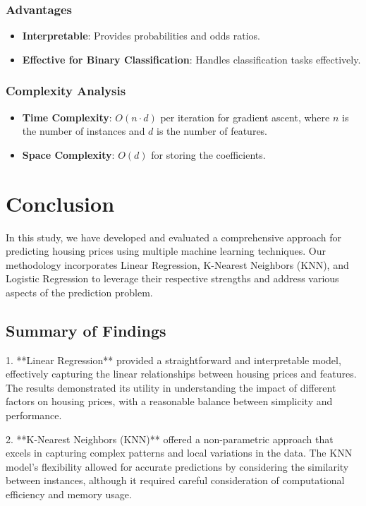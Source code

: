 \documentclass[10pt,conference,compsoc]{IEEEtran}
\begin{document}
{\subsubsection{Advantages}

\begin{itemize}
    \item \textbf{Interpretable}: Provides probabilities and odds ratios.
    \item \textbf{Effective for Binary Classification}: Handles classification tasks effectively.
\end{itemize}

\subsubsection{Complexity Analysis}

\begin{itemize}
    \item \textbf{Time Complexity}: \(O(n \cdot d)\) per iteration for gradient ascent, where \(n\) is the number of instances and \(d\) is the number of features.
    \item \textbf{Space Complexity}: \(O(d)\) for storing the coefficients.
\end{itemize}

\section{Conclusion}

In this study, we have developed and evaluated a comprehensive approach for predicting housing prices using multiple machine learning techniques. Our methodology incorporates Linear Regression, K-Nearest Neighbors (KNN), and Logistic Regression to leverage their respective strengths and address various aspects of the prediction problem.

\subsection{Summary of Findings}

1. **Linear Regression** provided a straightforward and interpretable model, effectively capturing the linear relationships between housing prices and features. The results demonstrated its utility in understanding the impact of different factors on housing prices, with a reasonable balance between simplicity and performance.

2. **K-Nearest Neighbors (KNN)** offered a non-parametric approach that excels in capturing complex patterns and local variations in the data. The KNN model's flexibility allowed for accurate predictions by considering the similarity between instances, although it required careful consideration of computational efficiency and memory usage.

}
\end{document}
